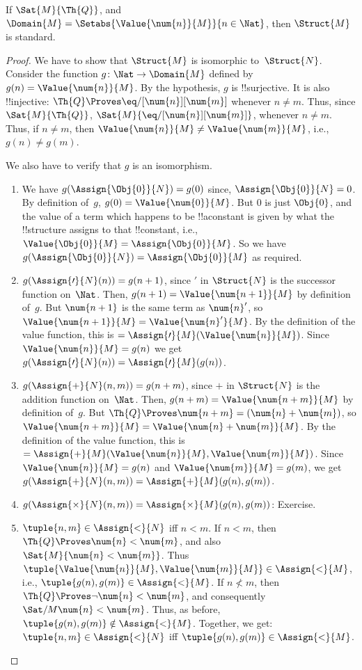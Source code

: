 \documentclass[../../../include/open-logic-section]{subfiles}
\begin{document}
\begin{prop}
If $\Sat{M}{\Th{Q}}$, and $\Domain{M} = \Setabs{\Value{\num{n}}{M}}{n
  \in \Nat}$, then $\Struct{M}$ is standard.
\end{prop}

\begin{proof}
We have to show that $\Struct{M}$ is isomorphic
to~$\Struct{N}$. Consider the function $g\colon \Nat \to \Domain{M}$
defined by $g(n) = \Value{\num{n}}{M}$. By the hypothesis, $g$ is
!!{surjective}.  It is also !!{injective}: $\Th{Q} \Proves
\eq/[\num{n}][\num{m}]$ whenever $n \neq m$. Thus, since
$\Sat{M}{\Th{Q}}$, $\Sat{M}{\eq/[\num{n}][\num{m}]}$, whenever $n \neq
m$. Thus, if $n \neq m$, then $\Value{\num{n}}{M} \neq
\Value{\num{m}}{M}$, i.e., $g(n) \neq g(m)$.

We also have to verify that $g$ is an isomorphism.
\begin{enumerate}
\item We have $g(\Assign{\Obj{0}}{N}) = g(0)$ since,
  $\Assign{\Obj{0}}{N} = 0$. By definition of~$g$, $g(0) =
  \Value{\num{0}}{M}$. But $\num{0}$ is just $\Obj{0}$, and the value
  of a term which happens to be !!a{constant} is given by what the
  !!{structure} assigns to that !!{constant}, i.e.,
  $\Value{\Obj{0}}{M} = \Assign{\Obj{0}}{M}$. So we have
  $g(\Assign{\Obj{0}}{N}) = \Assign{\Obj{0}}{M}$ as required.
\item $g(\Assign{\prime}{N}(n)) = g(n+1)$, since $\prime$ in
  $\Struct{N}$ is the successor function on~$\Nat$. Then, $g(n+1) =
  \Value{\num{n+1}}{M}$ by definition of~$g$. But $\num{n+1}$ is the
  same term as $\num{n}'$, so $\Value{\num{n+1}}{M} =
  \Value{\num{n}'}{M}$. By the definition of the value function, this
  is $= \Assign{\prime}{M}(\Value{\num{n}}{M})$. Since
    $\Value{\num{n}}{M} = g(n)$ we get $g(\Assign{\prime}{N}(n)) =
  \Assign{\prime}{M}(g(n))$.
\item $g(\Assign{+}{N}(n,m)) = g(n+m)$, since $+$ in $\Struct{N}$ is
  the addition function on~$\Nat$. Then, $g(n+m) =
  \Value{\num{n+m}}{M}$ by definition of~$g$. But $\Th{Q} \Proves
  \num{n+m} = (\num{n} + \num{m})$, so $\Value{\num{n+m}}{M} =
  \Value{\num{n}+\num{m}}{M}$. By the definition of the value
  function, this is $=
  \Assign{+}{M}(\Value{\num{n}}{M},\Value{\num{m}}{M})$. Since
    $\Value{\num{n}}{M} = g(n)$ and $\Value{\num{m}}{M} = g(m)$, we
    get $g(\Assign{+}{N}(n, m)) = \Assign{+}{M}(g(n), g(m))$.
\item $g(\Assign{\times}{N}(n, m)) = \Assign{\times}{M}(g(n), g(m))$:
  Exercise.
\item $\tuple{n,m} \in \Assign{<}{N}$ iff $n < m$. If $n < m$, then
  $\Th{Q} \Proves \num{n} < \num{m}$, and also $\Sat{M}{\num{n} <
  \num{m}}$. Thus $\tuple{\Value{\num{n}}{M}, \Value{\num{m}}{M}} \in
  \Assign{<}{M}$, i.e., $\tuple{g(n), g(m)} \in \Assign{<}{M}$. If $n
  \not< m$, then $\Th{Q} \Proves \lnot \num{n} < \num{m}$, and
  consequently $\Sat/{M}{\num{n} < \num{m}}$. Thus, as before,
  $\tuple{g(n), g(m)} \notin \Assign{<}{M}$. Together, we get:
  $\tuple{n,m} \in \Assign{<}{N}$ iff $\tuple{g(n), g(m)} \in
  \Assign{<}{M}$.
\end{enumerate}
\end{proof}
\end{document}
